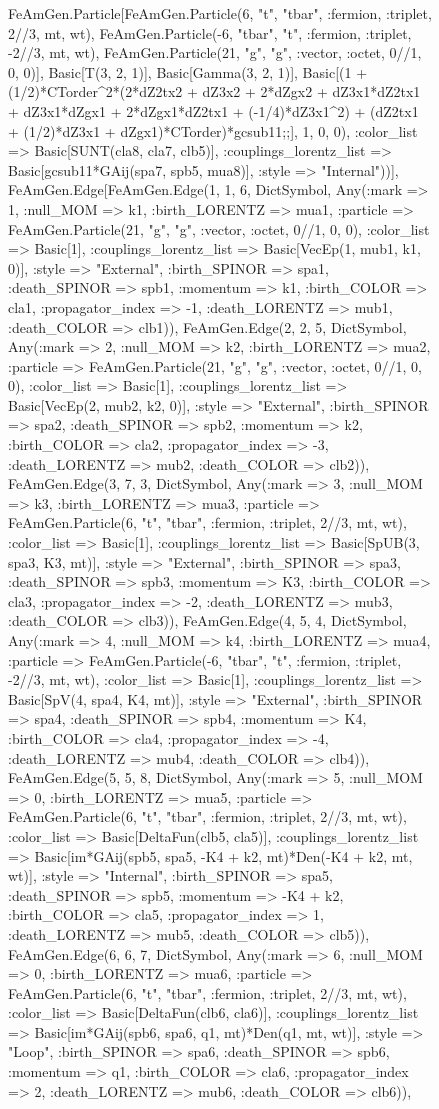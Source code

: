 \documentclass{revtex4}
\begin{document}
\begin{figure}[!htb]
\begin{center}
{FeAmGen.Particle[FeAmGen.Particle(6, "t", "tbar", :fermion, :triplet, 2//3, mt, wt), FeAmGen.Particle(-6, "tbar", "t", :fermion, :triplet, -2//3, mt, wt), FeAmGen.Particle(21, "g", "g", :vector, :octet, 0//1, 0, 0)], Basic[T(3, 2, 1)], Basic[Gamma(3, 2, 1)], Basic[(1 + (1/2)*CTorder^2*(2*dZ2tx2 + dZ3x2 + 2*dZgx2 + dZ3x1*dZ2tx1 + dZ3x1*dZgx1 + 2*dZgx1*dZ2tx1 + (-1/4)*dZ3x1^2) + (dZ2tx1 + (1/2)*dZ3x1 + dZgx1)*CTorder)*gcsub11;;], 1, 0, 0), :color_list => Basic[SUNT(cla8, cla7, clb5)], :couplings_lorentz_list => Basic[gcsub11*GAij(spa7, spb5, mua8)], :style => "Internal"))], FeAmGen.Edge[FeAmGen.Edge(1, 1, 6, Dict{Symbol, Any}(:mark => 1, :null_MOM => k1, :birth_LORENTZ => mua1, :particle => FeAmGen.Particle(21, "g", "g", :vector, :octet, 0//1, 0, 0), :color_list => Basic[1], :couplings_lorentz_list => Basic[VecEp(1, mub1, k1, 0)], :style => "External", :birth_SPINOR => spa1, :death_SPINOR => spb1, :momentum => k1, :birth_COLOR => cla1, :propagator_index => -1, :death_LORENTZ => mub1, :death_COLOR => clb1)), FeAmGen.Edge(2, 2, 5, Dict{Symbol, Any}(:mark => 2, :null_MOM => k2, :birth_LORENTZ => mua2, :particle => FeAmGen.Particle(21, "g", "g", :vector, :octet, 0//1, 0, 0), :color_list => Basic[1], :couplings_lorentz_list => Basic[VecEp(2, mub2, k2, 0)], :style => "External", :birth_SPINOR => spa2, :death_SPINOR => spb2, :momentum => k2, :birth_COLOR => cla2, :propagator_index => -3, :death_LORENTZ => mub2, :death_COLOR => clb2)), FeAmGen.Edge(3, 7, 3, Dict{Symbol, Any}(:mark => 3, :null_MOM => k3, :birth_LORENTZ => mua3, :particle => FeAmGen.Particle(6, "t", "tbar", :fermion, :triplet, 2//3, mt, wt), :color_list => Basic[1], :couplings_lorentz_list => Basic[SpUB(3, spa3, K3, mt)], :style => "External", :birth_SPINOR => spa3, :death_SPINOR => spb3, :momentum => K3, :birth_COLOR => cla3, :propagator_index => -2, :death_LORENTZ => mub3, :death_COLOR => clb3)), FeAmGen.Edge(4, 5, 4, Dict{Symbol, Any}(:mark => 4, :null_MOM => k4, :birth_LORENTZ => mua4, :particle => FeAmGen.Particle(-6, "tbar", "t", :fermion, :triplet, -2//3, mt, wt), :color_list => Basic[1], :couplings_lorentz_list => Basic[SpV(4, spa4, K4, mt)], :style => "External", :birth_SPINOR => spa4, :death_SPINOR => spb4, :momentum => K4, :birth_COLOR => cla4, :propagator_index => -4, :death_LORENTZ => mub4, :death_COLOR => clb4)), FeAmGen.Edge(5, 5, 8, Dict{Symbol, Any}(:mark => 5, :null_MOM => 0, :birth_LORENTZ => mua5, :particle => FeAmGen.Particle(6, "t", "tbar", :fermion, :triplet, 2//3, mt, wt), :color_list => Basic[DeltaFun(clb5, cla5)], :couplings_lorentz_list => Basic[im*GAij(spb5, spa5, -K4 + k2, mt)*Den(-K4 + k2, mt, wt)], :style => "Internal", :birth_SPINOR => spa5, :death_SPINOR => spb5, :momentum => -K4 + k2, :birth_COLOR => cla5, :propagator_index => 1, :death_LORENTZ => mub5, :death_COLOR => clb5)), FeAmGen.Edge(6, 6, 7, Dict{Symbol, Any}(:mark => 6, :null_MOM => 0, :birth_LORENTZ => mua6, :particle => FeAmGen.Particle(6, "t", "tbar", :fermion, :triplet, 2//3, mt, wt), :color_list => Basic[DeltaFun(clb6, cla6)], :couplings_lorentz_list => Basic[im*GAij(spb6, spa6, q1, mt)*Den(q1, mt, wt)], :style => "Loop", :birth_SPINOR => spa6, :death_SPINOR => spb6, :momentum => q1, :birth_COLOR => cla6, :propagator_index => 2, :death_LORENTZ => mub6, :death_COLOR => clb6)), }
\end{center}
\end{figure}
\end{document}
